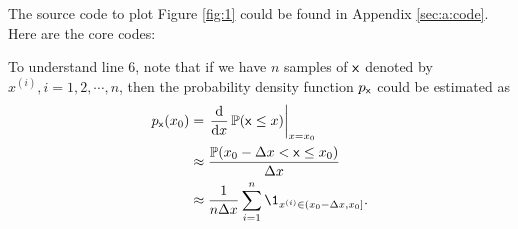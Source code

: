 \documentclass[a4paper]{article}
\begin{document}
\begin{enumerate}
  The source code to plot Figure \ref{fig:1} could be found in Appendix \ref{sec:a:code}. Here are the core codes:
  
  
  To understand line 6, note that if we have $n$ samples of $\mathsf{x}$ denoted by $x^{(i)}, i = 1, 2, \cdots, n$, then the probability density function $p_{\mathsf{x}}$ could be estimated as
  \begin{equation*}
    \begin{aligned}
      p_{\rvx}(x_0) &= \left.\frac{\mathrm{d}}{\mathrm{d}x} \Prob(\rvx \leq x) \right|_{x = x_0} \\
      &\approx \frac{\Prob(x_0 - \Delta x < \rvx \leq x_0)}{\Delta x}\\
      &\approx \frac{1}{n\Delta x} \sum_{i = 1}^n \1_{x^{(i)} \in (x_0 - \Delta x, x_0]}.
    \end{aligned}    
  \end{equation*}
    
\end{enumerate}
  
  
  
\end{document}
